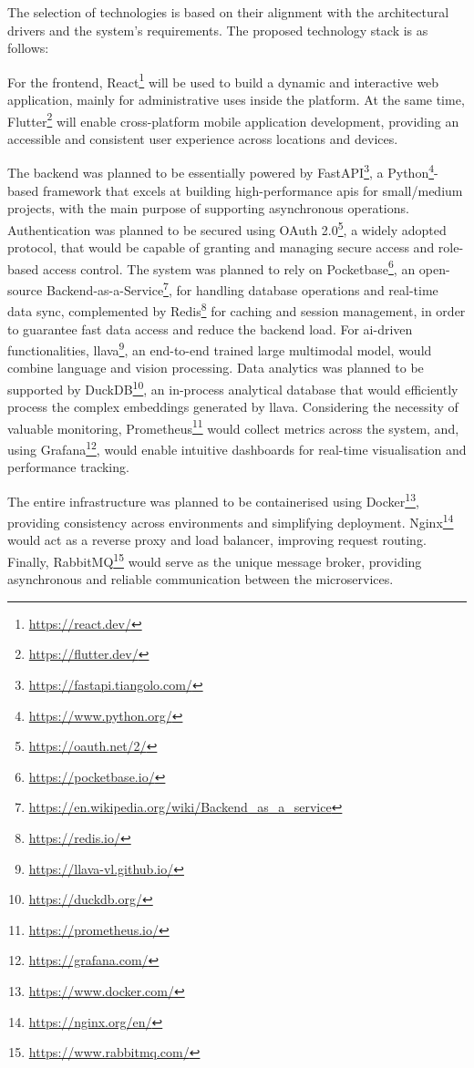 The selection of technologies is based on their alignment with the architectural drivers and the system's requirements. The proposed technology stack is as follows:

For the frontend, React\footnote{\url{https://react.dev/}} will be used to build a dynamic and interactive web application, mainly for administrative uses inside the platform. At the same time, Flutter\footnote{\url{https://flutter.dev/}} will enable cross-platform mobile application development, providing an accessible and consistent user experience across locations and devices.

The backend was planned to be essentially powered by FastAPI\footnote{\url{https://fastapi.tiangolo.com/}}, a Python\footnote{\url{https://www.python.org/}}-based framework that excels at building high-performance \acp{api} for small/medium projects, with the main purpose of supporting asynchronous operations. Authentication was planned to be secured using OAuth 2.0\footnote{\url{https://oauth.net/2/}}, a widely adopted protocol, that would be capable of granting and managing secure access and role-based access control. The system was planned to rely on Pocketbase\footnote{\url{https://pocketbase.io/}}, an open-source Backend-as-a-Service\footnote{\url{https://en.wikipedia.org/wiki/Backend_as_a_service}}, for handling database operations and real-time data sync, complemented by Redis\footnote{\url{https://redis.io/}} for caching and session management, in order to guarantee fast data access and reduce the backend load. For \ac{ai}-driven functionalities, \ac{llava}\footnote{\url{https://llava-vl.github.io/}}, an end-to-end trained large multimodal model, would combine language and vision processing. Data analytics was planned to be supported by DuckDB\footnote{\url{https://duckdb.org/}}, an in-process analytical database that would efficiently process the complex embeddings generated by \ac{llava}. Considering the necessity of valuable monitoring, Prometheus\footnote{\url{https://prometheus.io/}} would collect metrics across the system, and, using Grafana\footnote{\url{https://grafana.com/}}, would enable intuitive dashboards for real-time visualisation and performance tracking. 

The entire infrastructure was planned to be containerised using Docker\footnote{\url{https://www.docker.com/}}, providing consistency across environments and simplifying deployment. Nginx\footnote{\url{https://nginx.org/en/}} would act as a reverse proxy and load balancer, improving request routing. Finally, RabbitMQ\footnote{\url{https://www.rabbitmq.com/}} would serve as the unique message broker, providing asynchronous and reliable communication between the microservices.

